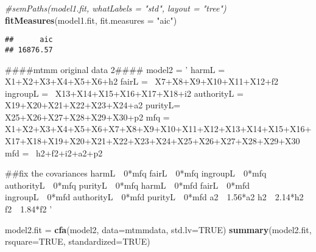 \documentclass[english,man]{apa6}
\newenvironment{Shaded}{\begin{snugshade}}{\end{snugshade}}
\newcommand{\KeywordTok}[1]{\textcolor[rgb]{0.13,0.29,0.53}{\textbf{#1}}}
\newcommand{\DataTypeTok}[1]{\textcolor[rgb]{0.13,0.29,0.53}{#1}}
\newcommand{\StringTok}[1]{\textcolor[rgb]{0.31,0.60,0.02}{#1}}
\newcommand{\CommentTok}[1]{\textcolor[rgb]{0.56,0.35,0.01}{\textit{#1}}}
\newcommand{\OtherTok}[1]{\textcolor[rgb]{0.56,0.35,0.01}{#1}}
\newcommand{\NormalTok}[1]{#1}
\newcounter{author}
\theoremstyle{definition}
\theoremstyle{definition}
\theoremstyle{definition}
\theoremstyle{remark}
\begin{document}
\begin{Shaded}
\begin{Highlighting}[]
\CommentTok{#semPaths(model1.fit, whatLabels = "std", layout = "tree")}
\KeywordTok{fitMeasures}\NormalTok{(model1.fit, }\DataTypeTok{fit.measures =} \StringTok{"aic"}\NormalTok{)}
\end{Highlighting}
\end{Shaded}

\begin{verbatim}
##      aic 
## 16876.57
\end{verbatim}

\begin{Shaded}
\begin{Highlighting}[]
\NormalTok{####mtmm original data 2####}
\NormalTok{model2 =}\StringTok{ '}
\StringTok{harmL =~ X1+X2+X3+X4+X5+X6+h2}
\StringTok{fairL =~ X7+X8+X9+X10+X11+X12+f2}
\StringTok{ingroupL =~ X13+X14+X15+X16+X17+X18+i2}
\StringTok{authorityL =~ X19+X20+X21+X22+X23+X24+a2}
\StringTok{purityL=~ X25+X26+X27+X28+X29+X30+p2}
\StringTok{mfq =~ X1+X2+X3+X4+X5+X6+X7+X8+X9+X10+X11+X12+X13+X14+X15+X16+X17+X18+X19+X20+X21+X22+X23+X24+X25+X26+X27+X28+X29+X30}
\StringTok{mfd =~ h2+f2+i2+a2+p2}

\StringTok{##fix the covariances}
\StringTok{harmL~~0*mfq}
\StringTok{fairL~~0*mfq}
\StringTok{ingroupL~~0*mfq}
\StringTok{authorityL~~0*mfq}
\StringTok{purityL~~0*mfq}
\StringTok{harmL~~0*mfd}
\StringTok{fairL~~0*mfd}
\StringTok{ingroupL~~0*mfd}
\StringTok{authorityL~~0*mfd}
\StringTok{purityL~~0*mfd}
\StringTok{a2~~1.56*a2}
\StringTok{h2~~2.14*h2}
\StringTok{f2~~1.84*f2}
\StringTok{'}

\NormalTok{model2.fit =}\StringTok{ }\KeywordTok{cfa}\NormalTok{(model2, }\DataTypeTok{data=}\NormalTok{mtmmdata, }\DataTypeTok{std.lv=}\OtherTok{TRUE}\NormalTok{)}
\KeywordTok{summary}\NormalTok{(model2.fit, }\DataTypeTok{rsquare=}\OtherTok{TRUE}\NormalTok{, }\DataTypeTok{standardized=}\OtherTok{TRUE}\NormalTok{)}
\end{Highlighting}
\end{Shaded}
\end{document}
